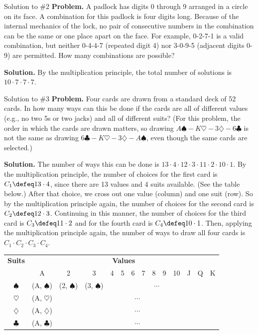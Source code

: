 \documentclass[dvipsnames, 10pt]{beamer}
\begin{document}
\begin{frame}{Solution to \#2}
\textbf{Problem.} A padlock has digits 0 through 9 arranged in a circle on its face. A combination for this padlock is four digits long. Because of the internal mechanics of the lock, no pair of consecutive numbers in the combination can be the same or one place apart on the face.  For example, 0-2-7-1 is a valid combination, but neither 0-4-4-7 (repeated digit 4) nor 3-0-9-5 (adjacent digits 0-9) are permitted.  How many combinations are possible?

\vfill 

\textbf{Solution.}  By the multiplication principle, the total number of solutions is $10 \cdot 7 \cdot 7 \cdot 7$.

\end{frame}


\begin{frame}{Solution to \#3}
\footnotesize 
\textbf{Problem.} Four cards are drawn from a standard deck of 52 cards. In how many ways can this be done if the cards are all of different values (e.g., no two 5s or two jacks) and all of different suits?  (For this problem, the order in which the cards are drawn matters, so drawing $A \spadesuit-K \heartsuit - 3 \diamondsuit - 6 \clubsuit$ is not the same as drawing $6 \clubsuit -K \heartsuit - 3 \diamondsuit - A \spadesuit$, even though the same cards are selected.) 

\vfill 

\textbf{Solution.} The number of ways this can be done is $13 \cdot 4 \cdot 12 \cdot 3 \cdot 11 \cdot 2 \cdot 10 \cdot 1$. By the multiplication principle, the number of choices for the first card is $C_1 \defeq 13 \cdot 4$, since there are 13 values and 4 suits available.  (See the table below.)  After that choice, we cross out one value (column) and one suit (row).  So by the multiplication principle again, the number of choices for the second card is $C_2 \defeq  12 \cdot 3$.  Continuing in this manner, the number of choices for the third card is $C_3 \defeq  11 \cdot 2$ and for the fourth card is $C_4 \defeq  10 \cdot 1$.   Then, applying the multiplication principle again, the number of ways to draw all four cards is $C_1 \cdot C_2 \cdot C_3 \cdot C_4$.


\vfill 

\begin{table}
\centering
\begin{tabular}{c|ccccccccccccc}
\textbf{Suits} & \multicolumn{13}{c}{\textbf{Values}} \\
& A & 2 & 3 & 4 & 5 & 6 & 7 & 8 & 9 & 10 & J & Q & K \\
\hline 
$\spadesuit$ & (A, $\spadesuit$) & (2, $\spadesuit$)  & (3, $\spadesuit$)  &  \multicolumn{9}{c}{$\cdots$}  \\
$\heartsuit$  & (A, $\heartsuit$) &  \multicolumn{12}{c}{$\cdots$} \\
$\diamondsuit$ & (A, $\diamondsuit$) &  \multicolumn{12}{c}{$\cdots$} \\
$\clubsuit$ &  (A, $\clubsuit$) &  \multicolumn{12}{c}{$\cdots$} \\
\end{tabular}
\end{table}




\end{frame}
\end{document}
